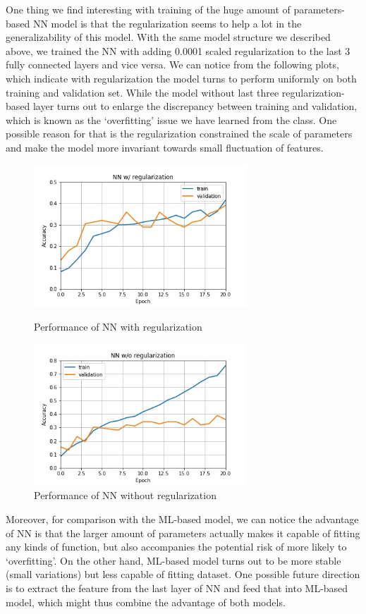 \documentclass[a4paper, 11pt]{article}
\begin{document}
One thing we find interesting with training of the huge amount of parameters-based NN model is that the regularization seems to help a lot in the generalizability of this model. With the same model structure we described above, we trained the NN with adding 0.0001 scaled regularization to the last 3 fully connected layers and vice versa. We can notice from the following plots, which indicate with regularization the model turns to perform uniformly on both training and validation set. While the model without last three regularization-based layer turns out to enlarge the discrepancy between training and validation, which is known as the `overfitting' issue we have learned from the class. One possible reason for that is the regularization constrained the scale of parameters and make the model more invariant towards small fluctuation of features.
\begin{figure}[!h]
\centering
\begin{minipage}[t]{0.48\textwidth}
\centering
\includegraphics[width=8cm]{image/NNwr.jpg}
\caption{Performance of NN with regularization}
\end{minipage}
\begin{minipage}[t]{0.48\textwidth}
\centering
\includegraphics[width=8cm]{image/NNwor.jpg}
\caption{Performance of NN without regularization}
\end{minipage}
\end{figure}


Moreover, for comparison with the ML-based model, we can notice the advantage of NN is that the larger amount of parameters actually makes it capable of fitting any kinds of function, but also accompanies the potential risk of more likely to `overfitting'. On the other hand, ML-based model turns out to be more stable (small variations) but less capable of fitting dataset. One possible future direction is to extract the feature from the last layer of NN and feed that into ML-based model, which might thus combine the advantage of both models.
\end{document}
